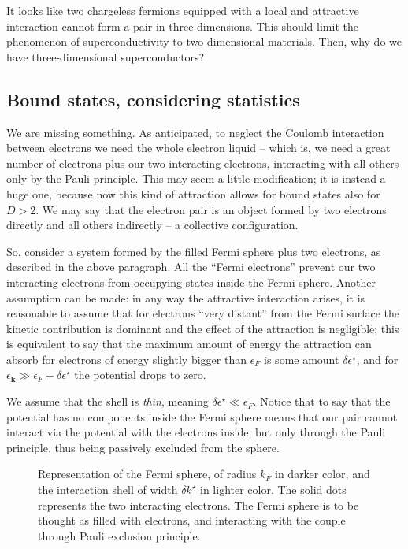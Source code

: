 It looks like two chargeless fermions equipped with a local and attractive interaction cannot form a pair in three dimensions. This should limit the phenomenon of superconductivity to two-dimensional materials. Then, why do we have three-dimensional superconductors? 

\subsection{Bound states, considering statistics}

We are missing something. As anticipated, to neglect the Coulomb interaction between electrons we need the whole electron liquid -- which is, we need a great number of electrons plus our two interacting electrons, interacting with all others only by the Pauli principle. This may seem a little modification; it is instead a huge one, because now this kind of attraction allows for bound states also for $D>2$. We may say that the electron pair is an object formed by two electrons directly and all others indirectly -- a collective configuration.

So, consider a system formed by the filled Fermi sphere plus two electrons, as described in the above paragraph. All the ``Fermi electrons'' prevent our two interacting electrons from occupying states inside the Fermi sphere. Another assumption can be made: in any way the attractive interaction arises, it is reasonable to assume that for electrons ``very distant'' from the Fermi surface the kinetic contribution is dominant and the effect of the attraction is negligible; this is equivalent to say that the maximum amount of energy the attraction can absorb for electrons of energy slightly bigger than $\epsilon_F$ is some amount $\delta \epsilon^\star$, and for $\epsilon_\mathbf{k} \gg \epsilon_F + \delta \epsilon^\star$ the potential drops to zero.

We assume that the shell is \textit{thin}, meaning $\delta\epsilon^\star \ll \epsilon_F$. Notice that to say that the potential has no components inside the Fermi sphere means that our pair cannot interact via the potential with the electrons inside, but only through the Pauli principle, thus being passively excluded from the sphere.

\begin{figure}
	\centering
	
	\caption{Representation of the Fermi sphere, of radius $k_F$ in darker color, and the interaction shell of width $\delta k^\star$ in lighter color. The solid dots represents the two interacting electrons. The Fermi sphere is to be thought as filled with electrons, and interacting with the couple through Pauli exclusion principle.}
	\label{fig:fermi sphere and shell}
\end{figure}

